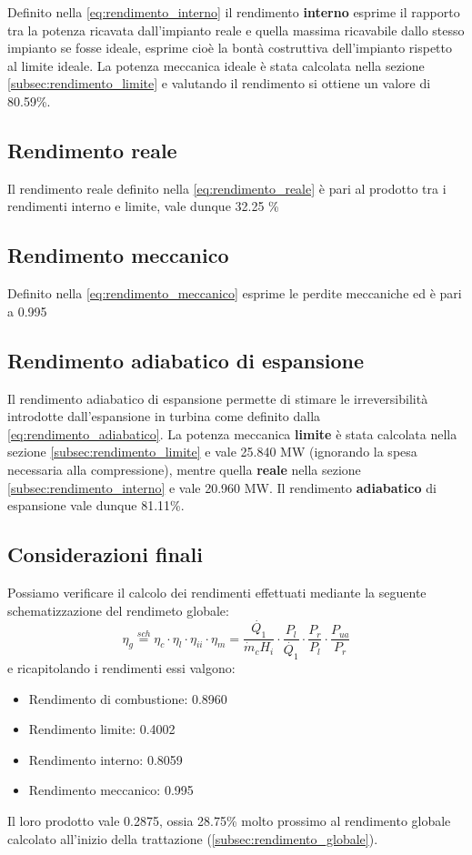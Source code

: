 \documentclass[a4paper,12pt]{article}
\begin{document}
Definito nella \eqref{eq:rendimento_interno} il rendimento \textbf{interno} esprime il rapporto tra la potenza ricavata dall'impianto reale
e quella massima ricavabile dallo stesso impianto se fosse ideale, esprime cioè la bontà costruttiva dell'impianto rispetto al limite ideale.
La potenza meccanica ideale è stata calcolata nella sezione \ref{subsec:rendimento_limite} e valutando il rendimento si ottiene un valore di 
80.59\%.

\subsection{Rendimento reale}
Il rendimento reale definito nella \eqref{eq:rendimento_reale} è pari al prodotto tra i rendimenti interno e limite, vale dunque 32.25 \%

\subsection{Rendimento meccanico}
Definito nella \eqref{eq:rendimento_meccanico} esprime le perdite meccaniche ed è pari a 0.995

\subsection{Rendimento adiabatico di espansione}
Il rendimento adiabatico di espansione permette di stimare le irreversibilità introdotte dall'espansione in turbina come definito dalla \eqref{eq:rendimento_adiabatico}.
La potenza meccanica \textbf{limite} è stata calcolata nella sezione \ref{subsec:rendimento_limite} e vale 25.840 MW (ignorando la spesa necessaria alla compressione),
mentre quella \textbf{reale} nella sezione \ref{subsec:rendimento_interno} e vale 20.960 MW.
Il rendimento \textbf{adiabatico} di espansione vale dunque 81.11\%.

\subsection{Considerazioni finali}
Possiamo verificare il calcolo dei rendimenti effettuati mediante la seguente schematizzazione del rendimeto globale:
\begin{equation}
    \eta_g \stackrel{sch}{=} \eta_c \cdot \eta_l \cdot \eta_{ii} \cdot \eta_m
    = \frac{\dot{Q_1}}{\dot{m}_c H_i}\cdot \frac{P_l}{\dot{Q_1}} \cdot \frac{P_r}{P_l}\cdot \frac{P_{ua}}{P_r}
\end{equation}
e ricapitolando i rendimenti essi valgono:
\begin{itemize}
    \item Rendimento di combustione: 0.8960
    \item Rendimento limite: 0.4002
    \item Rendimento interno: 0.8059
    \item Rendimento meccanico: 0.995
\end{itemize}
Il loro prodotto vale 0.2875, ossia 28.75\% molto prossimo al rendimento globale calcolato all'inizio della trattazione (\ref{subsec:rendimento_globale}).

\end{document}
